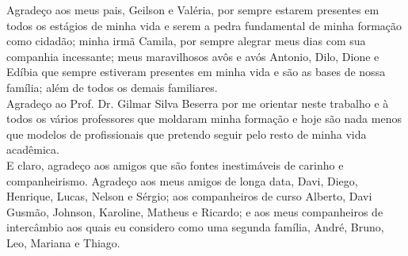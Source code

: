 \begin{agradecimentos}
Agradeço aos meus pais, Geilson e Valéria, por sempre estarem presentes em todos os estágios de minha vida e serem a pedra fundamental de minha formação como cidadão; minha irmã Camila, por sempre alegrar meus dias com sua companhia incessante; meus maravilhosos avôs e avós Antonio, Dilo, Dione e Edíbia que sempre estiveram presentes em minha vida e são as bases de nossa família; além de todos os demais familiares.
\\ \indent Agradeço ao Prof. Dr. Gilmar Silva Beserra por me orientar neste trabalho e à todos os vários professores que moldaram minha formação e hoje são nada menos que modelos de profissionais que pretendo seguir pelo resto de minha vida acadêmica.
\\ \indent E claro, agradeço aos amigos que são fontes inestimáveis de carinho e companheirismo. Agradeço aos meus amigos de longa data, Davi, Diego, Henrique, Lucas, Nelson e Sérgio; aos companheiros de curso Alberto, Davi Gusmão, Johnson, Karoline, Matheus e Ricardo; e aos meus companheiros de intercâmbio aos quais eu considero como uma segunda família, André, Bruno, Leo, Mariana e Thiago.
\end{agradecimentos}
